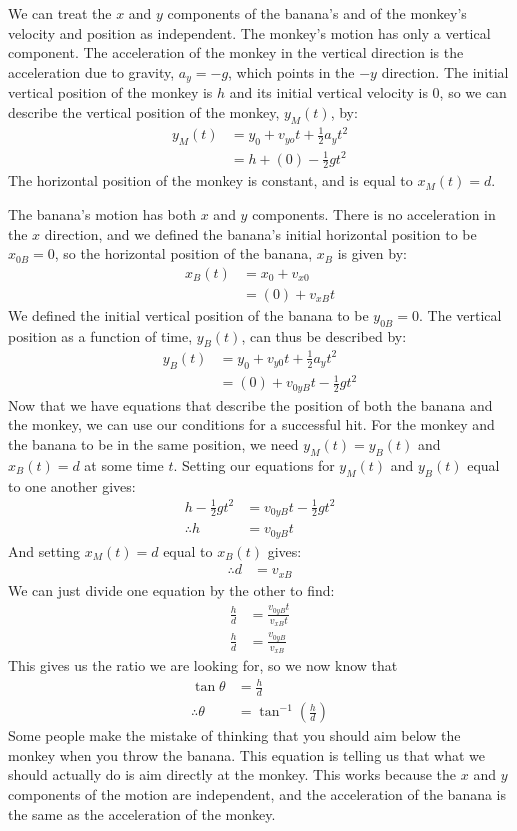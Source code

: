 \begin{example}
We can treat the $x$ and $y$ components of the banana's and of the monkey's velocity and position as independent. The monkey's motion has only a vertical component. The acceleration of the monkey in the vertical direction is the acceleration due to gravity, $a_y=-g$, which points in the $-y$ direction. The initial vertical position of the monkey is $h$ and its initial vertical velocity is 0, so we can describe the vertical position of the monkey, $y_M(t)$, by:
\begin{align*}
y_M(t)&=y_0+v_{yo}t+\frac{1}{2}a_yt^2\\
&=h+(0)-\frac{1}{2}gt^2
\end{align*}
The horizontal position of the monkey is constant, and is equal to $x_M(t)=d$.

The banana's motion has both $x$ and $y$ components. There is no acceleration in the $x$ direction, and we defined the banana's initial horizontal position to be $x_{0B}=0$, so the horizontal position of the banana, $x_B$ is given by:
\begin{align*}
x_B(t)&=x_0+v_{x0}\\
&=(0)+v_{xB}t
\end{align*}
We defined the initial vertical position of the banana to be $y_{0B}=0$. The vertical position as a function of time, $y_B(t)$, can thus be described by:
\begin{align*}
y_B(t)&=y_0+v_{y0}t+\frac{1}{2}a_yt^2\\
&=(0)+v_{0yB}t-\frac{1}{2}gt^2
\end{align*}
Now that we have equations that describe the position of both the banana and the monkey, we can use our conditions for a successful hit. For the monkey and the banana to be in the same position, we need $y_M(t)=y_B(t)$ and $x_B(t)=d$ at some time $t$. Setting our equations for $y_M(t)$ and $y_B(t)$ equal to one another gives:
\begin{align*}
h-\frac{1}{2} gt^2&=v_{0yB}t-\frac{1}{2}gt^2\\
\therefore h&=v_{0yB}t
\end{align*}
And setting $x_M(t)=d$ equal to $x_B(t)$ gives:
\begin{align*}
\therefore d&=v_{xB}
\end{align*} 
We can just divide one equation by the other to find:
\begin{align*}
\frac{h}{d}&=\frac{v_{0yB}t}{v_{xB}t}\\
\frac{h}{d}&=\frac{v_{0yB}}{v_{xB}}
\end{align*}
This gives us the ratio we are looking for, so we now know that
\begin{align*}
\tan\theta&=\frac{h}{d}\\
\therefore \theta&=\tan^{-1}\left(\frac{h}{d}\right)
\end{align*}
Some people make the mistake of thinking that you should aim below the monkey when you throw the banana. This equation is telling us that what we should actually do is aim directly at the monkey. This works because the $x$ and $y$ components of the motion are independent, and the acceleration of the banana is the same as the acceleration of the monkey. 

\end{example} 

